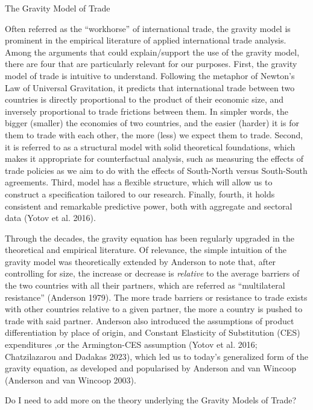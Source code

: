 The Gravity Model of Trade

Often referred as the ``workhorse'' of international trade, the gravity
model is prominent in the empirical literature of applied international
trade analysis. Among the arguments that could explain/support the use
of the gravity model, there are four that are particularly relevant for
our purposes. First, the gravity model of trade is intuitive to
understand. Following the metaphor of Newton's Law of Universal
Gravitation, it predicts that international trade between two countries
is directly proportional to the product of their economic size, and
inversely proportional to trade frictions between them. In simpler
words, the bigger (smaller) the economies of two countries, and the
easier (harder) it is for them to trade with each other, the more (less)
we expect them to trade. Second, it is referred to as a structural model
with solid theoretical foundations, which makes it appropriate for
counterfactual analysis, such as measuring the effects of trade policies
as we aim to do with the effects of South-North versus South-South
agreements. Third, model has a flexible structure, which will allow us
to construct a specification tailored to our research. Finally, fourth,
it holds consistent and remarkable predictive power, both with aggregate
and sectoral data (Yotov et al. 2016).

Through the decades, the gravity equation has been regularly upgraded in
the theoretical and empirical literature. Of relevance, the simple
intuition of the gravity model was theoretically extended by Anderson to
note that, after controlling for size, the increase or decrease is
\emph{relative} to the average barriers of the two countries with all
their partners, which are referred as ``multilateral resistance''
(Anderson 1979). The more trade barriers or resistance to trade exists
with other countries relative to a given partner, the more a country is
pushed to trade with said partner. Anderson also introduced the
assumptions of product differentiation by place of origin, and Constant
Elasticity of Substitution (CES) expenditures ,or the Armington-CES
assumption (Yotov et al. 2016; Chatzilazarou and Dadakas 2023), which
led us to today's generalized form of the gravity equation, as developed
and popularised by Anderson and van Wincoop (Anderson and van Wincoop
2003).

Do I need to add more on the theory underlying the Gravity Models of
Trade?

